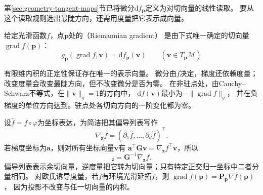 第\ref{sec:geometry-tangent-maps}节已将微分$\mathrm df_{\bm p}$定义为对切向量的线性读取。
要从这个读取规则选出最陡方向，还需用度量把它表示成向量。
\begin{definition}[Riemann梯度]
\label{def:geometry-riemannian-gradient}
给定光滑函数$f$，点$\bm p$处的（Riemannian gradient）
是由下式唯一确定的切向量$\operatorname{grad}f(\bm p)$：
\begin{equation}
 g_{\bm p}(\operatorname{grad}f,\bm v)=\mathrm df_{\bm p}(\bm v)
 \qquad(\bm v\in T_{\bm p}\mathcal M)
 \label{eq:geometry-riemannian-gradient-definition}
\end{equation}
\end{definition}
有限维内积的正定性保证存在唯一的表示向量。
微分由$f$决定，梯度还依赖度量；改变度量会改变最陡方向，但不改变微分是否为零。
在非驻点处，由Cauchy--Schwarz不等式，在$\lVert\bm v\rVert_g=1$的方向中，
$\mathrm df(\bm v)$最小为$-\lVert\operatorname{grad}f\rVert_g$，
并在负梯度的单位方向达到。驻点处各切向方向的一阶变化都为零。

设$\widehat f=f\circ\varphi$为坐标表达，为简洁把其偏导列表写作
\[
 \nabla_{\bm z}f=(\partial_1\widehat f,\ldots,\partial_d\widehat f)^\top.
\]
若梯度坐标为$\bm a$，则对所有坐标向量$\bm v$有
$\bm a^\top\bm G\bm v=\nabla_{\bm z}f^\top\bm v$，所以
\begin{equation}
 [\operatorname{grad}f]_{\bm z}=\bm G^{-1}\nabla_{\bm z}f.
 \label{eq:geometry-riemannian-gradient-coordinates}
\end{equation}
偏导列表表示余切向量，逆度量把它转为切向量；只有特定正交归一坐标中二者分量相同。
对欧氏诱导度量，若$f$有环境光滑延拓$\bar f$，则
$\operatorname{grad}f(\bm p)=\bm P_{\bm p}\nabla\bar f(\bm p)$，
因为投影不改变与任一切向量的内积。


